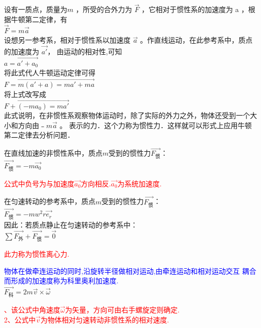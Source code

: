 \begin{definition}[惯性力]
    设有一质点，质量为$m$ ，所受的合外力为 $\vec{F}$ ，它相对于惯性系的加速度为 a ，根
据牛顿第二定律，有\\
\centering$\vec{F} = m\vec{a}$\\
设想另一参考系，相对于惯性系以加速度 $\vec{a}$ 。作直线运动，在此参考系中，质点的加速度为 $\vec{a'}$，
由运动的相对性,可知\\
 $\vec{a = a '+a_0}$\\
将此式代人牛顿运动定律可得\\
 $\vec{F = m ( a '+ a)= ma '+ ma}$\\
将上式改写成\\
 $\vec{F +(- ma_0 )= ma '}$\\
此式说明，在非惯性系观察物体运动时，除了实际的外力之外，物体还受到一个大小和方向由$﹣ m\vec{a}$ 。
表示的力．这个力称为惯性力．这样就可以形式上应用牛顿第二定律去分析问题．
\par
在直线加速的非惯性系中，质点$m$受到的惯性力$\vec{F_惯}$：\\
$\vec{F_惯}=-m\vec{a_0}$\\


\begin{note}
    \textcolor{red}{\kaishu 公式中负号为与加速度$\vec{a_0}$方向相反.$\vec{a_0}$为系统加速度.}
\end{note}


在匀速转动的参考系中，质点$m$受到的惯性力$\vec{F_惯}$：\\
$\vec{F_惯}=-mw^2r\vec{e_r}$\\
因此：若质点静止在匀速转动的参考系中：\\
$\sum \vec{F_外}+\vec{F_惯}=\vec{0}$ \\


\begin{note}
    \textcolor{red}{\kaishu 此力称为惯性离心力.}
\end{note}


\par
\par


\begin{supplement}[科里奥利加速度]
    \textcolor{blue}{\kaishu 物体在做牵连运动的同时,沿旋转半径做相对运动,由牵连运动和相对运动交互
    耦合而形成的加速度称为科里奥利加速度.\\}
    \centering$\vec{F_科}=2m\vec{v}\times\vec{\omega } $\\
    \begin{note}
        \textcolor{red}{、该公式中角速度$\vec{\omega }$为矢量，方向可由右手螺旋定则确定.\\
        2、公式中$\vec{v}$为物体相对匀速转动非惯性系的相对速度.}
    \end{note}

\end{supplement}

\end{definition}


